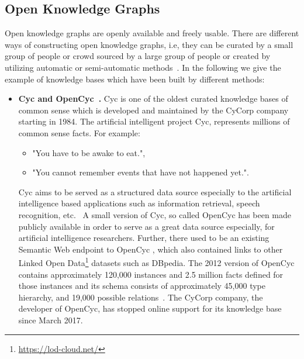 \subsection{Open Knowledge Graphs} 
Open knowledge graphs are openly available and freely usable. There are different ways of constructing open knowledge graphs, i.e, they can be curated by a small group of people or crowd sourced by a large group of people or created by utilizing automatic or semi-automatic methods~\cite{DBLP:journals/semweb/Paulheim17}. In the following we give the example of knowledge bases which have been built by different methods:
\begin{itemize}
\item \textbf{Cyc and OpenCyc~\cite{DBLP:journals/cacm/Lenat95}.} Cyc is one of the oldest curated knowledge bases of common sense which is developed and maintained by the CyCorp company starting in 1984. The artificial intelligent project Cyc, represents millions of common sense facts. For example:
\begin{itemize}
\item"You have to be awake to eat.", 
\item"You cannot remember events that have not happened yet.".
\end{itemize}
Cyc aims to be served as a structured data source especially to the artificial intelligence based applications such as information retrieval, speech recognition, etc.~\cite{DBLP:journals/cacm/Lenat95}
A small version of Cyc, so called OpenCyc has been made publicly available in order to serve as a great data source especially, for artificial intelligence researchers. Further, there used to be an existing Semantic Web endpoint to OpenCyc
, which also contained links to other Linked Open Data\footnote{\url{https://lod-cloud.net/}} datasets such as DBpedia. The 2012 version of OpenCyc contains approximately 120,000 instances and 2.5 million facts defined for those instances and its schema consists of approximately 45,000 type hierarchy, and 19,000 possible relations~\cite{DBLP:journals/semweb/Paulheim17}. The CyCorp company, the developer of OpenCyc, has stopped online support for its knowledge base since March 2017.\\


\end{itemize}
